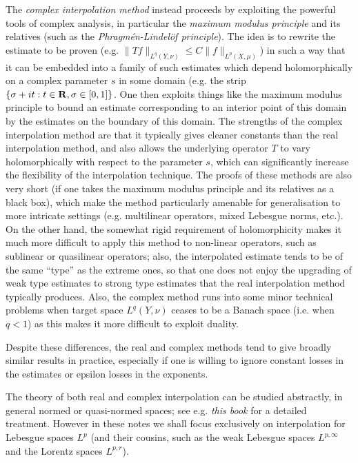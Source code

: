 \documentclass[10pt,reqno]{amsart}
\begin{document}
The \emph{complex interpolation method} instead proceeds by exploiting the powerful tools of complex analysis, in particular the \emph{maximum modulus principle} and its relatives (such as the \emph{Phragmén-Lindelöf principle}). The idea is to rewrite the estimate to be proven (e.g. $\| T f \|_{L^q(Y, \nu)} \leq C \| f \|_{L^p(X, \mu)}$) in such a way that it can be embedded into a family of such estimates which depend holomorphically on a complex parameter $s$ in some domain (e.g. the strip $\{ \sigma+it: t \in {\bf R}, \sigma \in [0,1]\}$. One then exploits things like the maximum modulus principle to bound an estimate corresponding to an interior point of this domain by the estimates on the boundary of this domain. The strengths of the complex interpolation method are that it typically gives cleaner constants than the real interpolation method, and also allows the underlying operator $T$ to vary holomorphically with respect to the parameter $s$, which can significantly increase the flexibility of the interpolation technique. The proofs of these methods are also very short (if one takes the maximum modulus principle and its relatives as a black box), which make the method particularly amenable for generalisation to more intricate settings (e.g. multilinear operators, mixed Lebesgue norms, etc.). On the other hand, the somewhat rigid requirement of holomorphicity makes it much more difficult to apply this method to non-linear operators, such as sublinear or quasilinear operators; also, the interpolated estimate tends to be of the same “type” as the extreme ones, so that one does not enjoy the upgrading of weak type estimates to strong type estimates that the real interpolation method typically produces. Also, the complex method runs into some minor technical problems when target space $L^q(Y,\nu)$ ceases to be a Banach space (i.e. when $q<1$) as this makes it more difficult to exploit duality.

Despite these differences, the real and complex methods tend to give broadly similar results in practice, especially if one is willing to ignore constant losses in the estimates or epsilon losses in the exponents.

The theory of both real and complex interpolation can be studied abstractly, in general normed or quasi-normed spaces; see e.g. \emph{this book} for a detailed treatment. However in these notes we shall focus exclusively on interpolation for Lebesgue spaces $L^p$ (and their cousins, such as the weak Lebesgue spaces $L^{p,\infty}$ and the Lorentz spaces $L^{p,r}$).
\end{document}
